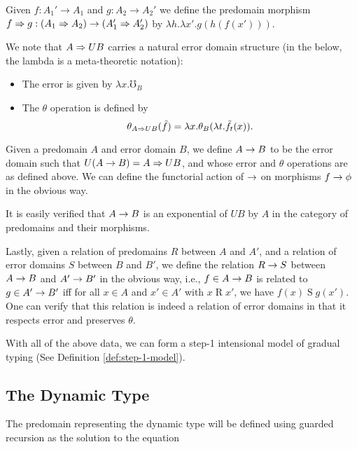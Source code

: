 Given $f : A_1' \to A_1$ and $g : A_2 \to A_2'$ we define the predomain morphism
$f \Rightarrow g : (A_1 \Rightarrow A_2) \to (A_1' \Rightarrow A_2')$ by $\lambda h. \lambda x'. g(h(f(x')))$.



We note that $A \Rightarrow UB$ carries a natural error domain structure
(in the below, the lambda is a meta-theoretic notation):
\begin{itemize}
    \item The error is given by $\lambda x . \mho_B$
    \item The $\theta$ operation is defined by
      \[ \theta_{A \Rightarrow UB}(\tilde{f}) = \lambda x . \theta_B(\lambda t . \tilde{f}_t(x)). \]
\end{itemize}

Given a predomain $A$ and error domain $B$, we define
$A \to B$ to be the error domain such that $U(A \to B) = A \Rightarrow UB$,
and whose error and $\theta$ operations are as defined above.
We can define the functorial action of $\to$ on morphisms
$f \to \phi$ in the obvious way.

It is easily verified that $A \to B$ is an exponential of $UB$ by $A$
in the category of predomains and their morphisms.

Lastly, given a relation of predomains $R$ between $A$ and $A'$, and a relation
of error domains $S$ between $B$ and $B'$, we define the relation $R \to S$
between $A \to B$ and $A' \to B'$ in the obvious way, i.e., $f \in A \to B$
is related to $g \in A' \to B'$ iff for all $x \in A$ and $x' \in A'$ with
$x \mathrel{R} x'$, we have $f(x) \mathrel{S} g(x')$.
%
One can verify that this relation is indeed a relation of error domains
in that it respects error and preserves $\theta$.

With all of the above data, we can form a step-1 intensional model of gradual typing
(See Definition \ref{def:step-1-model}).

\subsection{The Dynamic Type}

The predomain representing the dynamic type will be defined using guarded recursion
as the solution to the equation

